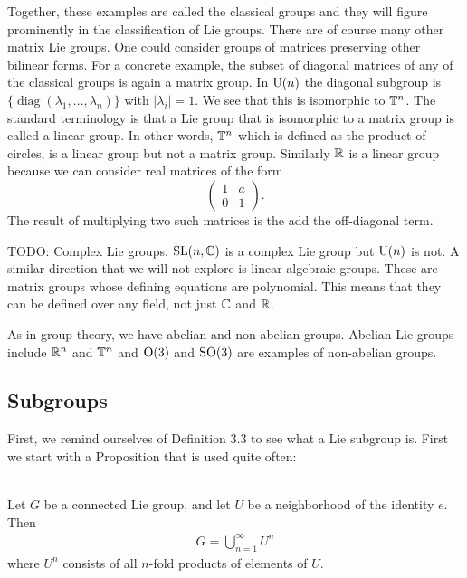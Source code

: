 Together, these examples are called the classical groups and they will figure prominently in the classification of Lie groups.
There are of course many other matrix Lie groups.
One could consider groups of matrices preserving other bilinear forms. 
For a concrete example, the subset of diagonal matrices of any of the classical groups is again a matrix group.
In $\mathrm{U}(n)$ the diagonal subgroup is $\{\operatorname{diag}(\lambda_1,\dots,\lambda_n)\}$ with $|\lambda_i| = 1$.
We see that this is isomorphic to $\mathbb{T}^n$.
The standard terminology is that a Lie group that is isomorphic to a matrix group is called a linear group.
In other words, $\mathbb{T}^n$ which is defined as the product of circles, is a linear group but not a matrix group.
Similarly $\mathbb{R}$ is a linear group because we can consider real matrices of the form
\[
\begin{pmatrix}
1 & a \\
0 & 1
\end{pmatrix}.
\]
The result of multiplying two such matrices is the add the off-diagonal term.

TODO: Complex Lie groups. $\mathrm{SL}(n,\mathbb{C})$ is a complex Lie group but $\mathrm{U}(n)$ is not.
A similar direction that we will not explore is linear algebraic groups.
These are matrix groups whose defining equations are polynomial.
This means that they can be defined over any field, not just $\mathbb{C}$ and $\mathbb{R}$.


As in group theory, we have abelian and non-abelian groups.
Abelian Lie groups include $\mathbb{R}^n$ and $\mathbb{T}^n$ and $\mathrm{O}(3)$ and $\mathrm{SO}(3)$ are examples of non-abelian groups.


\subsection{Subgroups}
First, we remind ourselves of Definition 3.3 to see what a Lie subgroup is. 
First we start with a Proposition that is used quite often:
\begin{Prop}
\textup{\cite[3.18]{Warner1983}}\\
Let $G$ be a connected Lie group, and let $U$ be a neighborhood of the identity $e$. Then 
\begin{align*}
G= \bigcup_{n=1}^{\infty} U^n
\end{align*}
where $U^n$ consists of all $n$-fold products of elements of $U$.
\end{Prop}

